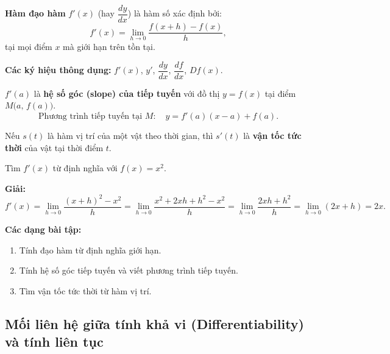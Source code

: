 \documentclass[12pt,a4paper]{article}
\begin{document}
\begin{dinhnghia}[title={Hàm đạo hàm}]
  \textbf{Hàm đạo hàm} $f'(x)$ (hay $\dfrac{dy}{dx}$) là hàm số xác định bởi:
  \[
    f'(x) = \lim_{h \to 0} \dfrac{f(x + h) - f(x)}{h},
  \]
  tại mọi điểm $x$ mà giới hạn trên tồn tại.

  \medskip
  \textbf{Các ký hiệu thông dụng:} $f'(x)$, $y'$, $\dfrac{dy}{dx}$, $\dfrac{df}{dx}$, $Df(x)$.
\end{dinhnghia}

\begin{dinhnghia}[title={Ý nghĩa hình học}]
  $f'(a)$ là \textbf{hệ số góc (slope) của tiếp tuyến} với đồ thị $y = f(x)$ tại điểm $M\bigl(a,\, f(a)\bigr)$.
  \[
    \text{Phương trình tiếp tuyến tại } M: \quad y = f'(a)(x - a) + f(a).
  \]
\end{dinhnghia}

\begin{dinhnghia}[title={Ý nghĩa vật lý}]
  Nếu $s(t)$ là hàm vị trí của một vật theo thời gian, thì $s'(t)$ là \textbf{vận tốc tức thời} của vật tại thời điểm $t$.
\end{dinhnghia}

\begin{vidu}
  Tìm $f'(x)$ từ định nghĩa với $f(x) = x^2$.

  \medskip\textbf{Giải:}
  \[
    f'(x) = \lim_{h \to 0} \dfrac{(x+h)^2 - x^2}{h}
    = \lim_{h \to 0} \dfrac{x^2 + 2xh + h^2 - x^2}{h}
    = \lim_{h \to 0} \dfrac{2xh + h^2}{h}
    = \lim_{h \to 0} (2x + h) = 2x.
  \]
\end{vidu}

\medskip\noindent\textbf{Các dạng bài tập:}
\begin{enumerate}[label=\textbf{Dạng \arabic*:}, leftmargin=*, align=left]
  \item Tính đạo hàm từ định nghĩa giới hạn.
  \item Tính hệ số góc tiếp tuyến và viết phương trình tiếp tuyến.
  \item Tìm vận tốc tức thời từ hàm vị trí.
\end{enumerate}

\subsection{Mối liên hệ giữa tính khả vi (Differentiability) và tính liên tục}
\end{document}
